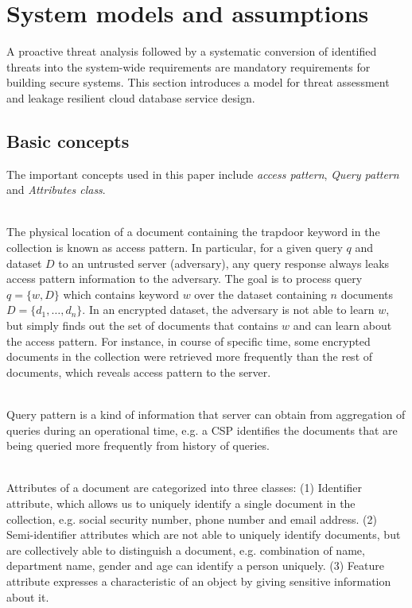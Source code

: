 \section{System models and assumptions}
\label{sec:systemModel}

A proactive threat analysis followed by a systematic conversion of identified threats into the system-wide requirements are mandatory requirements for building secure systems. This section introduces a model for threat assessment and leakage resilient cloud database service design. 

\subsection{Basic concepts}
\label{subsec:Preliminaries}


The important concepts used in this paper include \textit{access pattern}, \textit{Query pattern} and \textit{Attributes class}.

\begin{definition} \hfill \\
\label{def:accessPattern}
The physical location of a document containing the trapdoor keyword in the collection is known as access pattern. In particular, for a given query $q$ and dataset $D$ to an untrusted server (adversary), any query response always leaks access pattern information to the adversary. The goal is to process query $q=\{ w, D \}$ which contains keyword $w$ over the dataset containing $n$ documents $D=\{d_1,\dots,d_n\}$. In an encrypted dataset, the adversary is not able to learn $w$, but simply finds out the set of documents that contains $w$ and can learn about the access pattern. For instance, in course of specific time, some encrypted documents in the collection were retrieved more frequently than the rest of documents, which reveals access pattern to the server.
\end{definition} 

\begin{definition} \hfill \\
\label{def:queryPattern}
Query pattern is a kind of information that server can obtain from aggregation of queries during an operational time, e.g. a CSP identifies the documents that are being queried more frequently from history of queries.
\end{definition} 

\begin{definition} \hfill \\
\label{def:attributesClasses}
Attributes of a document are categorized into three classes: (1) Identifier attribute, which allows us to uniquely identify a single document in the collection, e.g. social security number, phone number and email address. (2) Semi-identifier attributes which are not able to uniquely identify documents, but are collectively able to distinguish a document, e.g. combination of name, department name, gender and age can identify a person uniquely. (3) Feature attribute expresses a characteristic of an object by giving sensitive information about it.
\end{definition} 



